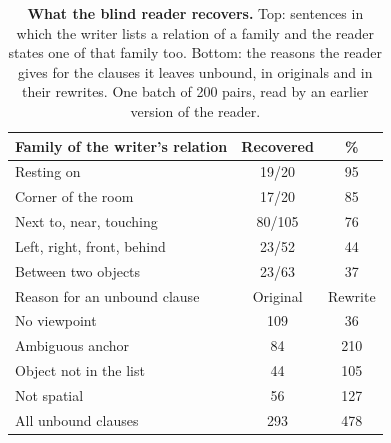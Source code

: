 \begin{table}[t]
\centering
\small
\setlength{\tabcolsep}{5pt}
\caption{\textbf{What the blind reader recovers.} Top: sentences in which the writer lists a relation of a family and the reader states one of that family too. Bottom: the reasons the reader gives for the clauses it leaves unbound, in originals and in their rewrites. One batch of 200 pairs, read by an earlier version of the reader.}
\label{tab:supp_reader}
\begin{tabular}{@{}lcc@{}}
\toprule
Family of the writer's relation & Recovered & \% \\
\midrule
Resting on & 19/20 & 95 \\
Corner of the room & 17/20 & 85 \\
Next to, near, touching & 80/105 & 76 \\
Left, right, front, behind & 23/52 & 44 \\
Between two objects & 23/63 & 37 \\
\midrule
Reason for an unbound clause & Original & Rewrite \\
\midrule
No viewpoint & 109 & 36 \\
Ambiguous anchor & 84 & 210 \\
Object not in the list & 44 & 105 \\
Not spatial & 56 & 127 \\
\addlinespace
All unbound clauses & 293 & 478 \\
\bottomrule
\end{tabular}
\end{table}
